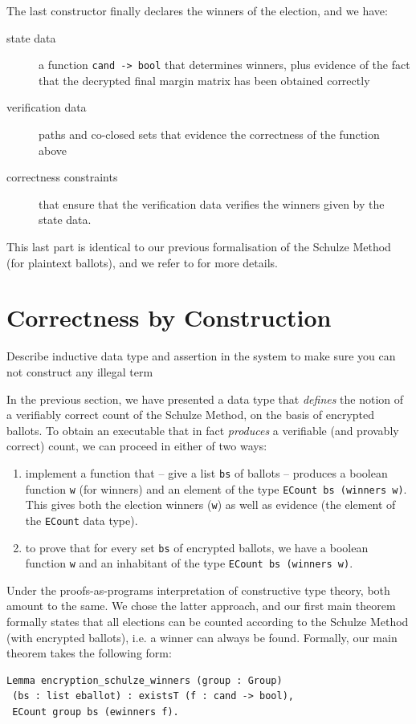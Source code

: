 \noindent
The last constructor finally declares the winners of the election,
and we have:
\begin{description}
  \item[state data] a function \texttt{cand -> bool} that determines
  winners, plus evidence of the fact that the decrypted final margin
  matrix has been obtained correctly
  \item[verification data] 
   paths and co-closed sets that evidence the correctness of the
   function above
 \item[correctness constraints] that ensure that the verification
 data verifies the winners given by the state data.
\end{description}
This last part is identical to our previous formalisation of the
Schulze Method (for plaintext ballots), and we refer to 
\cite{Pattinson:2017:SVE} for more details.
	   
   
\section{Correctness by Construction}
  Describe inductive data type and assertion in the 
  system to make sure you can not construct any 
  illegal term
  
  \label{sec:correct}

In the previous section, we have presented a data type that
\emph{defines} the notion of a verifiably correct count of the
Schulze Method, on the basis of encrypted ballots. To obtain an
executable that in fact \emph{produces} a verifiable (and provably
correct) count, we can proceed in either of two ways:
\begin{enumerate}
  \item implement a function that -- give a list \texttt{bs} of
  ballots -- produces a boolean function \texttt{w} (for winners) and an
  element of the type \texttt{ECount bs (winners w)}. This gives
  both the election winners (\texttt{w}) as well as evidence (the
  element of the \texttt{ECount} data type).
  \item to prove that for every set \texttt{bs} of encrypted
  ballots, we have a boolean function \texttt{w} and an inhabitant
  of the type \texttt{ECount bs (winners w)}.
\end{enumerate}

\noindent
Under the proofs-as-programs interpretation of constructive type
theory, both amount to the same. We chose the latter approach, and
our first main theorem formally states that all elections can be
counted according to the Schulze Method (with encrypted ballots),
i.e. a winner can always be found. Formally, our main theorem takes
the following form:
\begin{lstlisting}[frame=single,basicstyle=\ttfamily\footnotesize]
Lemma encryption_schulze_winners (group : Group) 
 (bs : list eballot) : existsT (f : cand -> bool), 
 ECount group bs (ewinners f).
\end{lstlisting}

